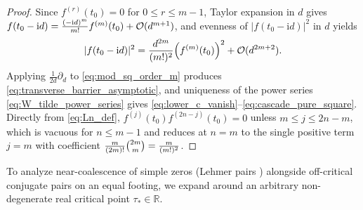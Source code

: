 \documentclass[11pt,reqno]{amsart}
\theoremstyle{definition}
\theoremstyle{remark}
\numberwithin{equation}{section}
\newcommand{\ii}{\mathrm{i}}
\newcommand{\fac}{\mathclose{\mathchar"0021}}
\begin{document}
\begin{proof}
Since $f^{(r)}(t_0) = 0$ for $0 \le r \le m-1$, Taylor expansion in $d$ gives $f(t_0 - \ii d) = \frac{(-\ii d)^m}{m\fac}f^{(m)}(t_0) + \mathcal{O}(d^{m+1})$, and evenness of $\lvert f(t_0-\ii d)\rvert^2$ in $d$ yields
\begin{equation}\label{eq:mod_sq_order_m}
  \lvert f(t_0 - \ii d)\rvert^2 = \frac{d^{2m}}{(m\fac)^2}\Bigl(f^{(m)}(t_0)\Bigr)^2 + \mathcal{O}(d^{2m+2}).
\end{equation}
Applying $\frac{1}{2d}\partial_d$ to \eqref{eq:mod_sq_order_m} produces \eqref{eq:transverse_barrier_asymptotic}, and uniqueness of the power series \eqref{eq:W_tilde_power_series} gives \eqref{eq:lower_c_vanish}--\eqref{eq:cascade_pure_square}. Directly from \eqref{eq:Ln_def}, $f^{(j)}(t_0)f^{(2n-j)}(t_0) = 0$ unless $m \le j \le 2n - m$, which is vacuous for $n \le m-1$ and reduces at $n = m$ to the single positive term $j = m$ with coefficient $\frac{m}{(2m)\fac}\binom{2m}{m} = \frac{m}{(m\fac)^2}$.
\end{proof}

To analyze near-coalescence of simple zeros (Lehmer pairs \cite{Lehmer1956,CsordasSmithVarga1994}) alongside off-critical conjugate pairs on an equal footing, we expand around an arbitrary non-degenerate real critical point $\tau_* \in \mathbb{R}$.
\end{document}
